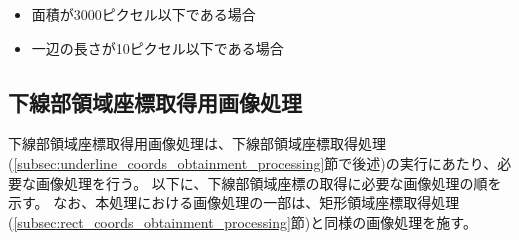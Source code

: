 \begin{itemize}
    \item 面積が3000ピクセル以下である場合
    \item 一辺の長さが10ピクセル以下である場合
\end{itemize}






\subsection{下線部領域座標取得用画像処理}\label{subsec:image_processing_for_underline_coords_obtainment}
下線部領域座標取得用画像処理は、下線部領域座標取得処理(\ref{subsec:underline_coords_obtainment_processing}節で後述)の実行にあたり、必要な画像処理を行う。
以下に、下線部領域座標の取得に必要な画像処理の順を示す。
なお、本処理における画像処理の一部は、矩形領域座標取得処理(\ref{subsec:rect_coords_obtainment_processing}節)と同様の画像処理を施す。

